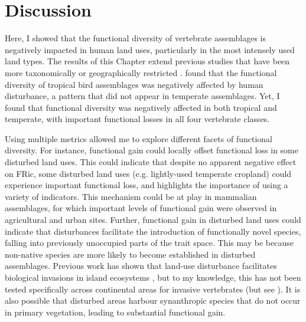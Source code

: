 \clearpage
\section{Discussion}
Here, I showed that the functional diversity of vertebrate assemblages is negatively impacted in human land uses, particularly in the most intensely used land types. The results of this Chapter extend previous studies that have been more taxonomically or geographically restricted \citep{Flynn2009, Matuoka2020}. \citet{Matuoka2020} found that the functional diversity of tropical bird assemblages was negatively affected by human disturbance, a pattern that did not appear in temperate assemblages. Yet, I found that functional diversity was negatively affected in both tropical and temperate, with important functional losses in all four vertebrate classes.

Using multiple metrics allowed me to explore different facets of functional diversity. For instance, functional gain could locally offset functional loss in some disturbed land uses. This could indicate that despite no apparent negative effect on FRic, some disturbed land uses (e.g. lightly-used temperate cropland) could experience important functional loss, and highlights the importance of using a variety of indicators. This mechanism could be at play in mammalian assemblages, for which important levels of functional gain were observed in agricultural and urban sites. Further, functional gain in disturbed land uses could indicate that disturbances facilitate the introduction of functionally novel species, falling into previously unoccupied parts of the trait space. This may be because non-native species are more likely to become established in disturbed assemblages. Previous work has shown that land-use disturbance facilitates biological invasions in island ecosystems \citep{Jesse2018,Sanchez-Ortiz2019}, but to my knowledge, this has not been tested specifically across continental areas for invasive vertebrates (but see \citet{Pysek2010}). It is also possible that disturbed areas harbour synanthropic species that do not occur in primary vegetation, leading to substantial functional gain.

